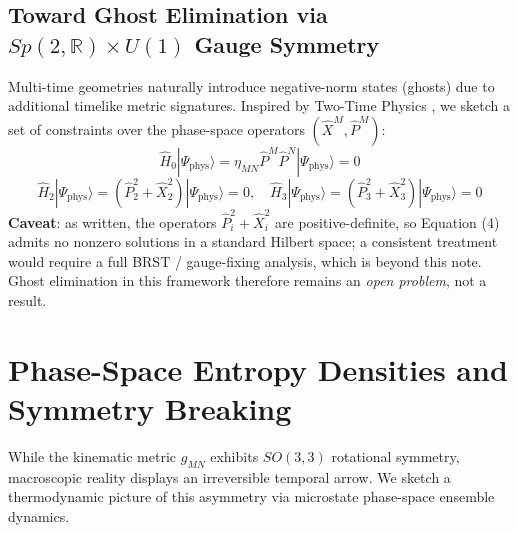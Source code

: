 \documentclass[11pt,a4paper]{article}
\begin{document}
\subsection{Toward Ghost Elimination via $Sp(2,\mathbb{R}) \times U(1)$ Gauge Symmetry}
Multi-time geometries naturally introduce negative-norm states (ghosts) due to additional timelike metric signatures. Inspired by Two-Time Physics \cite{Bars2006}, we sketch a set of constraints over the phase-space operators $(\hat{X}^M, \hat{P}^M)$:
\begin{equation}
\hat{H}_0 |\Psi_{\text{phys}}\rangle = \eta_{MN} \hat{P}^M \hat{P}^N |\Psi_{\text{phys}}\rangle = 0
\end{equation}
\begin{equation}
\hat{H}_2 |\Psi_{\text{phys}}\rangle = (\hat{P}_2^2 + \hat{X}_2^2) |\Psi_{\text{phys}}\rangle = 0, \quad \hat{H}_3 |\Psi_{\text{phys}}\rangle = (\hat{P}_3^2 + \hat{X}_3^2) |\Psi_{\text{phys}}\rangle = 0
\end{equation}
\textbf{Caveat}: as written, the operators $\hat{P}_i^2 + \hat{X}_i^2$ are positive-definite, so Equation (4) admits no nonzero solutions in a standard Hilbert space; a consistent treatment would require a full BRST / gauge-fixing analysis, which is beyond this note. Ghost elimination in this framework therefore remains an \emph{open problem}, not a result.

\section{Phase-Space Entropy Densities and Symmetry Breaking}

While the kinematic metric $g_{MN}$ exhibits $SO(3,3)$ rotational symmetry, macroscopic reality displays an irreversible temporal arrow. We sketch a thermodynamic picture of this asymmetry via microstate phase-space ensemble dynamics.
\end{document}

